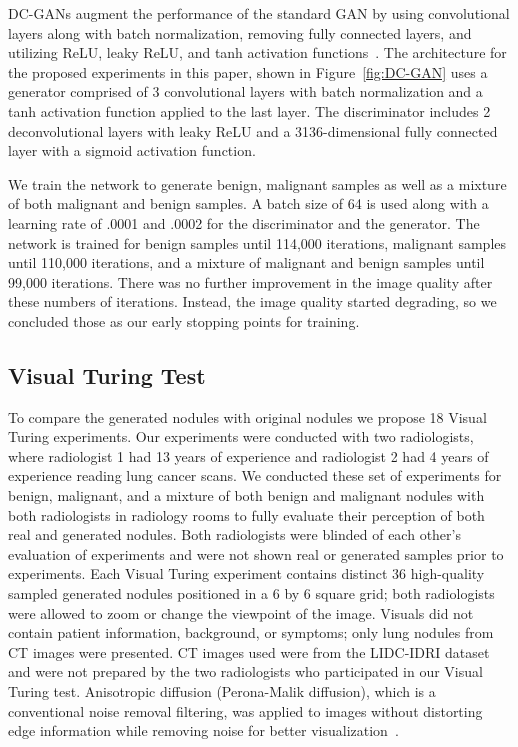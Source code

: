 \documentclass{article}
\begin{document}
DC-GANs augment the performance of the standard GAN by using convolutional layers along with batch normalization, removing fully connected layers, and utilizing ReLU, leaky ReLU, and tanh activation functions~\cite{radford2015unsupervised}. The architecture for the proposed experiments in this paper, shown in Figure~\ref{fig:DC-GAN} uses a generator comprised of 3 convolutional layers with batch normalization and a tanh activation function applied to the last layer. The discriminator includes 2 deconvolutional layers with leaky ReLU and a 3136-dimensional fully connected layer with a sigmoid activation function. 

We train the network to generate benign, malignant samples as well as a mixture of both malignant and benign samples. A batch size of 64 is used along with a learning rate of .0001 and .0002 for the discriminator and the generator. The network is trained for benign samples until 114,000 iterations, malignant samples until 110,000 iterations, and a mixture of malignant and benign samples until 99,000 iterations. There was no further improvement in the image quality after these numbers of iterations. Instead, the image quality started degrading, so we concluded those as our early stopping points for training.

\subsection{Visual Turing Test}
To compare the generated nodules with original nodules we propose 18 Visual Turing experiments. Our experiments were conducted with two radiologists, where radiologist 1 had 13 years of experience and radiologist 2 had 4 years of experience reading lung cancer scans. We conducted these set of experiments for benign, malignant, and a mixture of both benign and malignant nodules with both radiologists in radiology rooms to fully evaluate their perception of both real and generated nodules. Both radiologists were blinded of each other's evaluation of experiments and were not shown real or generated samples prior to experiments. Each Visual Turing experiment contains distinct 36 high-quality sampled generated nodules positioned in a 6 by 6 square grid; both radiologists were allowed to zoom or change the viewpoint of the image. Visuals did not contain patient information, background, or symptoms; only lung nodules from CT images were presented. CT images used were from the LIDC-IDRI dataset and were not prepared by the two radiologists who participated in our Visual Turing test. Anisotropic diffusion (Perona-Malik diffusion), which is a conventional noise removal filtering, was applied to images without distorting edge information while removing noise for better visualization~\cite{perona1990scale}. 
  
\end{document}
